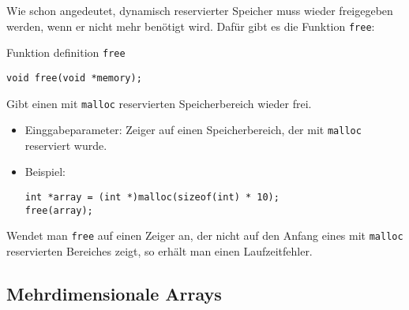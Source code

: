 Wie schon angedeutet, dynamisch reservierter Speicher muss wieder freigegeben werden, wenn er nicht mehr benötigt wird.
Dafür gibt es die Funktion \verb|free|:
\begin{myexampleblock}{Funktion definition \texttt{free}}
  \begin{lstlisting}
void free(void *memory);
  \end{lstlisting}
  \vspace{-0.7cm}
  Gibt einen mit \verb|malloc| reservierten Speicherbereich wieder frei.
  \begin{itemize}
  \item Einggabeparameter: Zeiger auf einen Speicherbereich, der mit \verb|malloc| reserviert wurde.
  \item Beispiel:
    \begin{lstlisting}
int *array = (int *)malloc(sizeof(int) * 10);
free(array);
    \end{lstlisting}
  \end{itemize}
  \vspace{-0.7cm}
\end{myexampleblock}
Wendet man \verb|free| auf einen Zeiger an, der nicht auf den Anfang eines mit \verb|malloc| reservierten Bereiches zeigt, so erhält man einen Laufzeitfehler.

\subsection{Mehrdimensionale Arrays}


